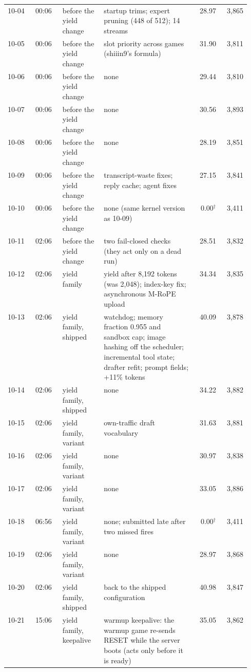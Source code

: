 \begin{table}[!p]
\begin{tabular}{@{}ll>{\raggedright\arraybackslash}p{0.17\linewidth}>{\raggedright\arraybackslash}p{0.38\linewidth}rr@{}}
10-04 & 00:06 & before the yield change & startup trims; expert pruning (448 of 512); 14 streams & 28.97 & 3,865 \\ %
10-05 & 00:06 & before the yield change & slot priority across games (shiiin9's formula) & 31.90 & 3,811 \\ %
10-06 & 00:06 & before the yield change & none & 29.44 & 3,810 \\ %
10-07 & 00:06 & before the yield change & none & 30.56 & 3,893 \\ %
10-08 & 00:06 & before the yield change & none & 28.19 & 3,851 \\ %
10-09 & 00:06 & before the yield change & transcript-waste fixes; reply cache; agent fixes & 27.15 & 3,841 \\ %
10-10 & 00:06 & before the yield change & none (same kernel version as 10-09) & 0.00$^\dagger$ & 3,411 \\ %
10-11 & 02:06 & before the yield change & two fail-closed checks (they act only on a dead run) & 28.51 & 3,832 \\ %
10-12 & 02:06 & yield family & yield after 8,192 tokens (was 2,048); index-key fix; asynchronous M-RoPE upload & 34.34 & 3,835 \\ %
10-13 & 02:06 & yield family, shipped & watchdog; memory fraction 0.955 and sandbox cap; image hashing off the scheduler; incremental tool state; drafter refit; prompt fields; +11\% tokens & 40.09 & 3,878 \\ %
10-14 & 02:06 & yield family, shipped & none & 34.22 & 3,882 \\ %
10-15 & 02:06 & yield family, variant & own-traffic draft vocabulary & 31.63 & 3,881 \\ %
10-16 & 02:06 & yield family, variant & none & 30.97 & 3,838 \\ %
10-17 & 02:06 & yield family, variant & none & 33.05 & 3,886 \\ %
10-18 & 06:56 & yield family, variant & none; submitted late after two missed fires & 0.00$^\dagger$ & 3,411 \\ %
10-19 & 02:06 & yield family, variant & none & 28.97 & 3,868 \\ %
10-20 & 02:06 & yield family, shipped & back to the shipped configuration & 40.98 & 3,847 \\ %
10-21 & 15:06 & yield family, keepalive & warmup keepalive: the warmup game re-sends RESET while the server boots (acts only before it is ready) & 35.05 & 3,862 \\ %

\end{tabular}
\end{table}

